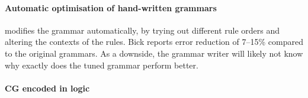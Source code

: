 



\paragraph{Automatic optimisation of hand-written grammars }

\cite{bick2013tuning} modifies the grammar automatically, by trying
out different rule orders and altering the contexts of the rules.
Bick reports error reduction of 7--15\% compared to the original grammars.
As a downside, the grammar writer will likely not know why exactly does the tuned grammar perform better.



\paragraph{CG encoded in logic}


